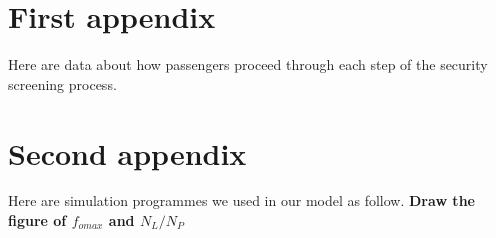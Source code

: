 \documentclass{mcmthesis}
\begin{document}
	\begin{appendices}
		
		\section{First appendix}
		Here are data  about how passengers proceed through each step of the security screening process. \\

		
		
		
		
		
		
		
		
		\section{Second appendix}
		Here are simulation programmes we used in our model as follow.
		\noindent \textbf{\textcolor[rgb]{0.98,0.00,0.00}{Draw the figure of $f_{omax}$ and $N_L/N_P$}}
		
%		
%		
%		
%		
%		
%		
%		
%		
%		
%		
	\end{appendices}
\end{document}
